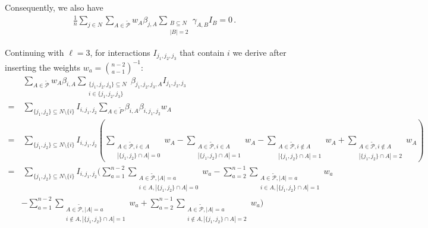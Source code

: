 Consequently, we also have
\begin{equation*}
	\begin{array}{rll}
        \frac{1}{n} \sum\limits_{j \in N} \sum\limits_{A \in \tilde{\mathcal{P}}} w_A \beta_{j,A} \sum\limits_{\substack{B \subseteq N \\ |B| = 2}} \gamma_{A,B} I_B = 0 \, .
	\end{array}
\end{equation*}

Continuing with $\ell=3$, for interactions $I_{j_1,j_2,j_3}$ that contain $i$ we derive after inserting the weights $w_a = \binom{n-2}{a-1}^{-1}$:
\begin{equation} \label{eq:triples_i_included}
	\begin{array}{rll}
		& \ \sum\limits_{A \in \tilde{\mathcal{P}}} w_A \beta_{i,A} \sum\limits_{\substack{\{j_1,j_2,j_3\} \subseteq N \\ i \in \{j_1,j_2,j_3\}}} \beta_{j_1,j_2,j_3,A} I_{j_1,j_2,j_3} \\
        = & \ \sum\limits_{\{j_1,j_2\} \subseteq N \setminus \{i\}} I_{i,j_1,j_2} \sum\limits_{A \in \tilde{P}} \beta_{i,A} \beta_{i,j_1,j_2} w_A \\
        = & \ \sum\limits_{\{j_1,j_2\} \subseteq N \setminus \{i\}} I_{i,j_1,j_2} \left( \sum\limits_{\substack{A \in \tilde{\mathcal{P}}, i \in A \\ |\{j_1,j_2\} \cap A|=0}} w_A - \sum\limits_{\substack{A \in \tilde{\mathcal{P}}, i \in A \\ |\{j_1,j_2\} \cap A|=1}} w_A - \sum\limits_{\substack{A \in \tilde{\mathcal{P}}, i \notin A \\ |\{j_1,j_2\} \cap A|=1}} w_A + \sum\limits_{\substack{A \in \tilde{\mathcal{P}}, i \notin A \\ |\{j_1,j_2\} \cap A|=2}} w_A \right) \\
        = & \ \sum\limits_{\{j_1,j_2\} \subseteq N \setminus \{i\}} I_{i,j_1,j_2} \Bigg( \sum\limits_{a=1}^{n-2} \sum\limits_{\substack{A \in \tilde{\mathcal{P}}, |A|=a \\ i \in A, |\{j_1,j_2\} \cap A|=0}} w_a - \sum\limits_{a=2}^{n-1} \sum\limits_{\substack{A \in \tilde{\mathcal{P}}, |A|=a \\ i \in A, |\{j_1,j_2\} \cap A|=1}} w_a \\
        & - \sum\limits_{a=1}^{n-2} \sum\limits_{\substack{A \in \tilde{\mathcal{P}}, |A|=a \\ i \notin A, |\{j_1,j_2\} \cap A|=1}} w_a + \sum\limits_{a=2}^{n-1} \sum\limits_{\substack{A \in \tilde{\mathcal{P}}, |A|=a \\ i \notin A, |\{j_1,j_2\} \cap A|=2}} w_a \Bigg) \\

\end{array}
\end{equation}
